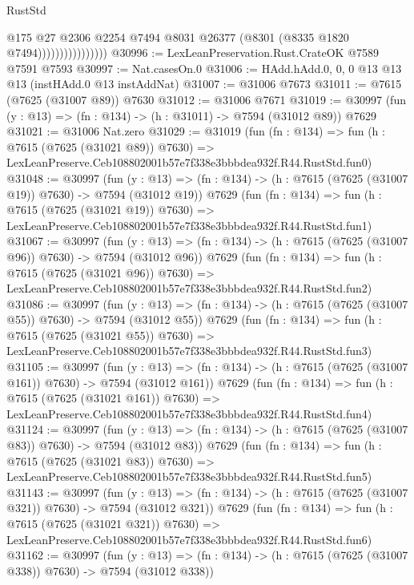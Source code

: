 \begin{lexlean}{RustStd}
\begin{coremodule}
                                @175
                                @27
                                @2306
                                @2254
                                @7494
                                @8031
                                @26377
                                (@8301 (@8335 @1820 @7494))))))))))))))))
@30996 := LexLeanPreservation.Rust.CrateOK @7589 @7591 @7593
@30997 := Nat.casesOn.{0}
@31006 := HAdd.hAdd.{0, 0, 0} @13 @13 @13 (instHAdd.{0} @13 instAddNat)
@31007 := @31006 @7673
@31011 := @7615 (@7625 (@31007 @89)) @7630
@31012 := @31006 @7671
@31019 := @30997 (fun (y : @13) => (fn : @134) -> (h : @31011) -> @7594 (@31012 @89)) @7629
@31021 := @31006 Nat.zero
@31029 := @31019
    (fun (fn : @134) =>
    fun (h : @7615 (@7625 (@31021 @89)) @7630) =>
    LexLeanPreserve.Ceb108802001b57e7f338e3bbbdea932f.R44.RustStd.fun0)
@31048 := @30997
    (fun (y : @13) => (fn : @134) -> (h : @7615 (@7625 (@31007 @19)) @7630) -> @7594 (@31012 @19))
    @7629
    (fun (fn : @134) =>
    fun (h : @7615 (@7625 (@31021 @19)) @7630) =>
    LexLeanPreserve.Ceb108802001b57e7f338e3bbbdea932f.R44.RustStd.fun1)
@31067 := @30997
    (fun (y : @13) => (fn : @134) -> (h : @7615 (@7625 (@31007 @96)) @7630) -> @7594 (@31012 @96))
    @7629
    (fun (fn : @134) =>
    fun (h : @7615 (@7625 (@31021 @96)) @7630) =>
    LexLeanPreserve.Ceb108802001b57e7f338e3bbbdea932f.R44.RustStd.fun2)
@31086 := @30997
    (fun (y : @13) => (fn : @134) -> (h : @7615 (@7625 (@31007 @55)) @7630) -> @7594 (@31012 @55))
    @7629
    (fun (fn : @134) =>
    fun (h : @7615 (@7625 (@31021 @55)) @7630) =>
    LexLeanPreserve.Ceb108802001b57e7f338e3bbbdea932f.R44.RustStd.fun3)
@31105 := @30997
    (fun (y : @13) => (fn : @134) -> (h : @7615 (@7625 (@31007 @161)) @7630) -> @7594 (@31012 @161))
    @7629
    (fun (fn : @134) =>
    fun (h : @7615 (@7625 (@31021 @161)) @7630) =>
    LexLeanPreserve.Ceb108802001b57e7f338e3bbbdea932f.R44.RustStd.fun4)
@31124 := @30997
    (fun (y : @13) => (fn : @134) -> (h : @7615 (@7625 (@31007 @83)) @7630) -> @7594 (@31012 @83))
    @7629
    (fun (fn : @134) =>
    fun (h : @7615 (@7625 (@31021 @83)) @7630) =>
    LexLeanPreserve.Ceb108802001b57e7f338e3bbbdea932f.R44.RustStd.fun5)
@31143 := @30997
    (fun (y : @13) => (fn : @134) -> (h : @7615 (@7625 (@31007 @321)) @7630) -> @7594 (@31012 @321))
    @7629
    (fun (fn : @134) =>
    fun (h : @7615 (@7625 (@31021 @321)) @7630) =>
    LexLeanPreserve.Ceb108802001b57e7f338e3bbbdea932f.R44.RustStd.fun6)
@31162 := @30997
    (fun (y : @13) => (fn : @134) -> (h : @7615 (@7625 (@31007 @338)) @7630) -> @7594 (@31012 @338))

\end{coremodule}
\end{lexlean}
